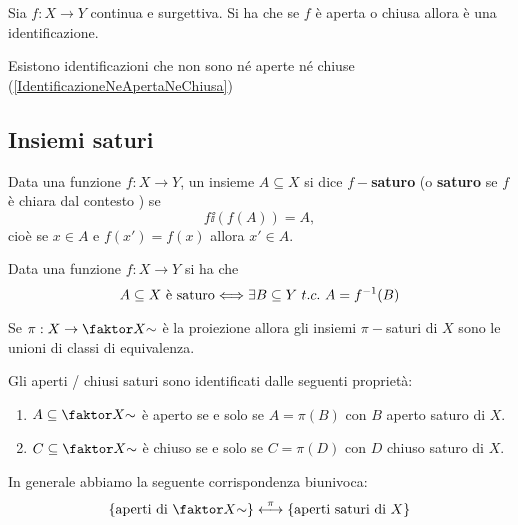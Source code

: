 \begin{multicols*}{2}
\begin{proposition}\label{CriterioSufficientePerIdentificazioni}
Sia $f:X\to Y$ continua e surgettiva. Si ha che se $f$ è aperta o chiusa allora è una identificazione.
\end{proposition}
\begin{remark}
Esistono identificazioni che non sono né aperte né chiuse (\ref{IdentificazioneNeApertaNeChiusa})
\end{remark}


\subsection{Insiemi saturi}
\begin{definition}
Data una funzione $f:X\to Y$, un insieme $A\subseteq X$ si dice \textbf{$f-$saturo} (o \textbf{saturo} se $f$ è chiara dal contesto
) se
\[f\ii(f(A))=A,\]
cioè se $x\in A$ e $f(x')=f(x)$ allora $x'\in A$.
\end{definition}
\begin{proposition}\label{CaratterizzazioneSaturi}
Data una funzione $f:X\to Y$ si ha che
\[A\subseteq X\text{ è saturo}\Longleftrightarrow \exists B\subseteq Y\ t.c.\ A=f^{-1}(B)\]
\end{proposition}

\begin{remark}
Se $\pi:X\to \quot X\sim$ è la proiezione allora gli insiemi $\pi-$saturi di $X$ sono le unioni di classi di equivalenza.
\end{remark}
\begin{proposition}\label{CaratterizzazioneDiApertiEChiusiSaturi}
Gli aperti / chiusi saturi sono identificati dalle seguenti proprietà:
\begin{enumerate}[noitemsep]
\item $A\subseteq \quot X\sim$ è aperto se e solo se $A=\pi(B)$ con $B$ aperto saturo di $X$.
\item $C\subseteq \quot X\sim$ è chiuso se e solo se $C=\pi(D)$ con $D$ chiuso saturo di $X$.
\end{enumerate}
\end{proposition}

\begin{remark}
In generale abbiamo la seguente corrispondenza biunivoca:
\[\{\text{aperti di }\quot X\sim\}\overset{\pi}{\longleftrightarrow}\{\text{aperti saturi di }X\}\]
\end{remark}


\end{multicols*}
